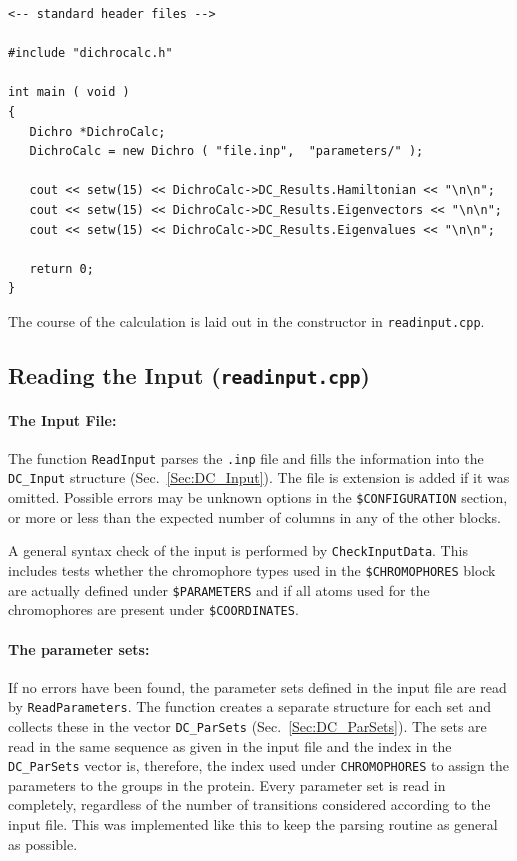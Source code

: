 \documentclass[11pt, letterpaper]{article}
\begin{document}
\begin{verbatim}
<-- standard header files -->

#include "dichrocalc.h"

int main ( void )
{
   Dichro *DichroCalc;
   DichroCalc = new Dichro ( "file.inp",  "parameters/" );

   cout << setw(15) << DichroCalc->DC_Results.Hamiltonian << "\n\n";
   cout << setw(15) << DichroCalc->DC_Results.Eigenvectors << "\n\n";
   cout << setw(15) << DichroCalc->DC_Results.Eigenvalues << "\n\n";
   
   return 0;
}
\end{verbatim}

The course of the calculation is laid out in the constructor in \verb'readinput.cpp'.




\subsection{Reading the Input (\texttt{readinput.cpp})}

\paragraph{The Input File:}
The function \verb'ReadInput' parses the \verb'.inp' file and fills the information into the \verb'DC_Input' structure (Sec.~\ref{Sec:DC_Input}). The file is extension is added if it was omitted. Possible errors may be unknown options in the \verb'$CONFIGURATION' section, or more or less than the expected number of columns in any of the other blocks.

A general syntax check of the input is performed by \texttt{CheckInputData}. This includes tests whether the chromophore types used in the \texttt{\$CHROMOPHORES} block are actually defined under \texttt{\$PARAMETERS} and if all atoms used for the chromophores are present under \texttt{\$COORDINATES}.

\paragraph{The parameter sets:}
If no errors have been found, the parameter sets defined in the input file are read by \verb'ReadParameters'. The function creates a separate structure for each set and collects these in the vector \verb'DC_ParSets' (Sec.~\ref{Sec:DC_ParSets}). The sets are read in the same sequence as given in the input file and the index in the \verb'DC_ParSets' vector is, therefore, the index used under \verb'CHROMOPHORES' to assign the parameters to the groups in the protein. Every parameter set is read in completely, regardless of the number of transitions considered according to the input file. This was implemented like this to keep the parsing routine as general as possible.
\end{document}
